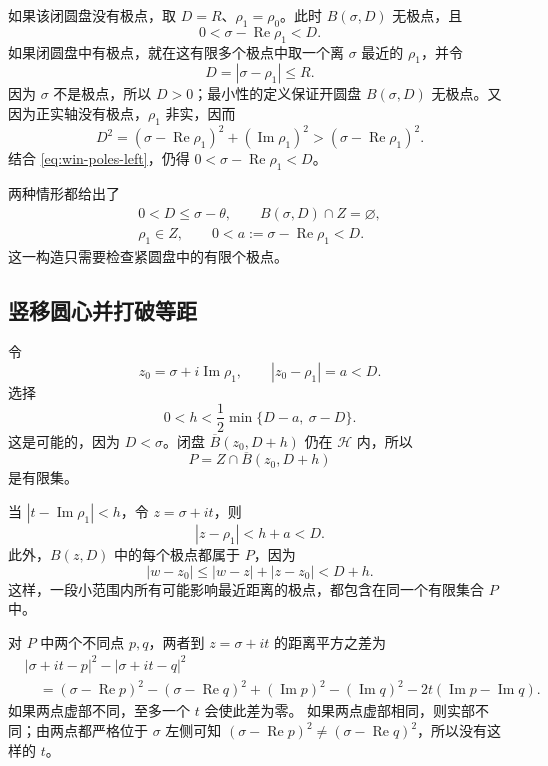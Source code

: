 \documentclass[UTF8,fontset=fandol,a4paper,openany,oneside]{ctexbook}
\theoremstyle{definition}
\theoremstyle{remark}
\begin{document}
如果该闭圆盘没有极点，取 $D=R$、$\rho_1=\rho_0$。此时 $B(\sigma,D)$ 无极点，且
\[
 0<\sigma-\operatorname{Re}\rho_1<D.
\]
如果闭圆盘中有极点，就在这有限多个极点中取一个离 $\sigma$ 最近的 $\rho_1$，并令
\[
 D=|\sigma-\rho_1|\le R.
\]
因为 $\sigma$ 不是极点，所以 $D>0$；最小性的定义保证开圆盘 $B(\sigma,D)$ 无极点。又因为正实轴没有极点，$\rho_1$ 非实，因而
\[
 D^2=(\sigma-\operatorname{Re}\rho_1)^2
             +(\operatorname{Im}\rho_1)^2
       >(\sigma-\operatorname{Re}\rho_1)^2.
\]
结合 \eqref{eq:win-poles-left}，仍得
$0<\sigma-\operatorname{Re}\rho_1<D$。

两种情形都给出了
\begin{equation}
 \begin{gathered}
 0<D\le\sigma-\theta,\qquad
 B(\sigma,D)\cap Z=\varnothing,\\
 \rho_1\in Z,\qquad
 0<a:=\sigma-\operatorname{Re}\rho_1<D.
 \end{gathered}
 \label{eq:win-free-disc}
\end{equation}
这一构造只需要检查紧圆盘中的有限个极点。

\subsection{竖移圆心并打破等距}

令
\[
 z_0=\sigma+i\operatorname{Im}\rho_1,
 \qquad |z_0-\rho_1|=a<D.
\]
选择
\begin{equation}
 0<h<\frac12\min\{D-a,\ \sigma-D\}.
 \label{eq:win-shift-margin}
\end{equation}
这是可能的，因为 $D<\sigma$。闭盘
$\overline B(z_0,D+h)$ 仍在 $\mathcal H$ 内，所以
\[
 P=Z\cap\overline B(z_0,D+h)
\]
是有限集。

当 $|t-\operatorname{Im}\rho_1|<h$，令 $z=\sigma+it$，则
\[
 |z-\rho_1|<h+a<D.
\]
此外，$B(z,D)$ 中的每个极点都属于 $P$，因为
\[
 |w-z_0|\le |w-z|+|z-z_0|<D+h.
\]
这样，一段小范围内所有可能影响最近距离的极点，都包含在同一个有限集合 $P$ 中。

对 $P$ 中两个不同点 $p,q$，两者到 $z=\sigma+it$ 的距离平方之差为
\begin{align*}
 &|\sigma+it-p|^2-|\sigma+it-q|^2\\
 &\quad=(\sigma-\operatorname{Re}p)^2
       -(\sigma-\operatorname{Re}q)^2
       +(\operatorname{Im}p)^2-(\operatorname{Im}q)^2
       -2t(\operatorname{Im}p-\operatorname{Im}q).
\end{align*}
如果两点虚部不同，至多一个 $t$ 会使此差为零。
如果两点虚部相同，则实部不同；由两点都严格位于 $\sigma$ 左侧可知
$(\sigma-\operatorname{Re}p)^2\ne
(\sigma-\operatorname{Re}q)^2$，所以没有这样的 $t$。
\end{document}
